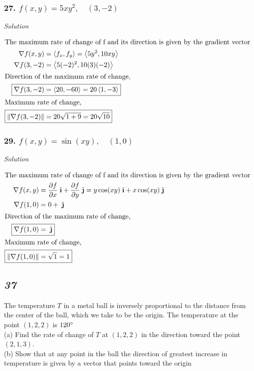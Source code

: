 \documentclass{article}
\newcommand{\ihat}{\;\hat{\textbf{\i}}}
\newcommand{\jhat}{\;\hat{\textbf{\j}}}
\newcommand\vv[1]{\left\langle #1 \right\rangle}
\newcommand\mgv[1]{\|#1\|}
\newcommand{\solution}{\centerline{\textit{Solution}}}
\newcommand{\pp}[2]{\displaystyle\frac{\partial #1}{\partial #2}}
\begin{document}
\subsubsection*{27. $f(x,y) = 5xy^2,\quad (3,-2)$}
\solution
\begin{align*}
    \intertext{The maximum rate of change of f and its direction is given by the
    gradient vector}
    \nabla f(x,y) &= \vv{f_x, f_y} = \vv{5y^2, 10xy} \\
    \nabla f(3,-2) &= \vv{5(-2)^2, 10(3)(-2)} \\
    \intertext{Direction of the maximum rate of change,}
    \Aboxed{\nabla f(3,-2) &= \vv{20, -60} = 20\vv{1,-3}} \\
    \intertext{Maximum rate of change,}
    \Aboxed{\mgv{\nabla f(3,-2)} &= 20\sqrt{1 + 9} = 20\sqrt{10}}
\end{align*}
\subsubsection*{29. $f(x,y) = \sin (xy),\quad (1,0)$}
\solution 
\begin{align*}
    \intertext{The maximum rate of change of f and its direction is given by the
    gradient vector}
    \nabla f(x,y) &= \pp f x\ihat + \pp f y\jhat = y\cos(xy)\ihat +
    x\cos(xy)\jhat \\
    \nabla f(1,0) &= 0 + \jhat \\
    \intertext{Direction of the maximum rate of change,}
    \Aboxed{\nabla f(1,0) &= \jhat} \\
    \intertext{Maximum rate of change,}
    \Aboxed{\mgv{\nabla f(1,0)} &= \sqrt 1 = 1}
\end{align*}
\newpage 
\begin{center}
    \subsection*{\textit{37}} 
\end{center}
The temperature $T$ in a metal ball is inversely proportional to the
distance from the center of the ball, which we take to be the origin. The
temperature at the point $(1,2,2)$ is $120\degree$
\vspace{1em} \\
\vspace{1em}
(a) Find the rate of change of $T$ at $(1,2,2)$ in the direction
toward the point $(2,1,3)$. \\
(b) Show that at any point in the ball the direction of greatest
increase in temperature is given by a vector that points toward the origin
\end{document}
